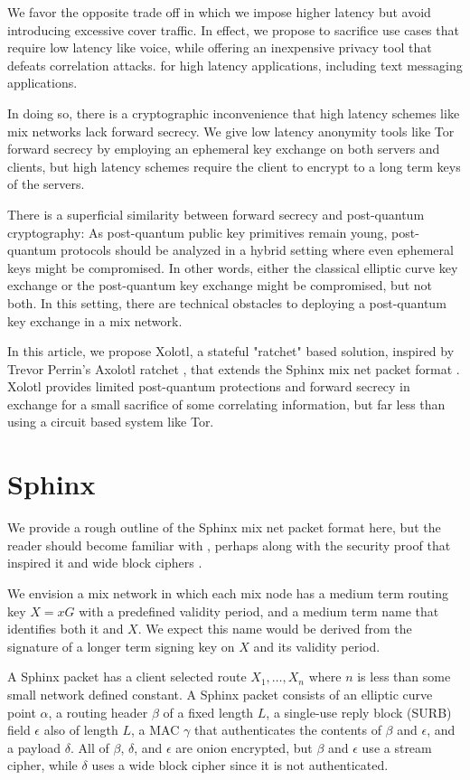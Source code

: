 \documentclass[twoside,letterpaper]{llncs}
\begin{document}
We favor the opposite trade off in which we impose higher latency but
avoid introducing excessive cover traffic. In effect, we propose to
sacrifice use cases that require low latency like voice, while
offering an inexpensive privacy tool that defeats correlation attacks.
for high latency applications, including text messaging applications.

In doing so, there is a cryptographic inconvenience that high latency
schemes like mix networks lack forward secrecy.  We give low latency
anonymity tools like Tor forward secrecy by employing an ephemeral
key exchange on both servers and clients, but high latency schemes
require the client to encrypt to a long term keys of the servers.

There is a superficial similarity between forward secrecy and
post-quantum cryptography:  As post-quantum public key primitives
remain young, post-quantum protocols should be analyzed in a hybrid
setting where even ephemeral keys might be compromised.  
In other words, either the classical elliptic curve key exchange or
the post-quantum key exchange might be compromised, but not both. 
In this setting, there are technical obstacles to deploying a
post-quantum key exchange in a mix network.  

In this article, we propose Xolotl, a stateful "ratchet" based
solution, inspired by Trevor Perrin's Axolotl ratchet \cite{TextSecure},
that extends the Sphinx mix net packet format \cite{Sphinx}.
Xolotl provides limited post-quantum protections and forward secrecy
in exchange for a small sacrifice of some correlating information,
but far less than using a circuit based system like Tor.


\section{Sphinx}

We provide a rough outline of the Sphinx mix net packet format here,
but the reader should become familiar with \cite{Sphinx}, perhaps 
along with the security proof that inspired it \cite{FormalOnion}
 and wide block ciphers \cite{Lionness}.

We envision a mix network in which each mix node has a
medium term routing key $X = x G$ with a predefined validity period,
and a medium term name that identifies both it and $X$.
We expect this name would be derived from the signature of a longer
term signing key on $X$ and its validity period.

A Sphinx packet has a client selected route $X_1,\ldots,X_n$
where $n$ is less than some small network defined constant.
A Sphinx packet consists of an elliptic curve point $\alpha$,
a routing header $\beta$ of a fixed length $L$,
a single-use reply block (SURB) field $\epsilon$ also of length $L$,
a MAC $\gamma$ that authenticates the contents of $\beta$ and $\epsilon$,
and a payload $\delta$.
All of $\beta$, $\delta$, and $\epsilon$ are onion encrypted,
but $\beta$ and $\epsilon$ use a stream cipher, while
 $\delta$ uses a wide block cipher since it is not authenticated.
\end{document}
